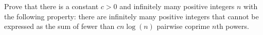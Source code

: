 Prove that there is a constant $c>0$ and infinitely many positive integers $n$ with the following property: there are infinitely many positive integers that cannot be expressed as the sum of fewer than $cn\log(n)$ pairwise coprime $n$th  powers.
